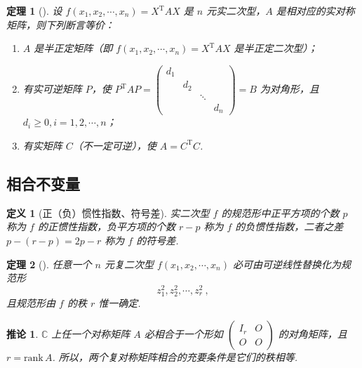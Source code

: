 \documentclass[zihao=-4,UTF8,linespread=1.8,nothm]{aytony_base}
\newtheorem{theorem}{\indent 定理}[subsection]
\newtheorem*{corollary}{\indent 推论}
\newtheorem{definition}{\indent 定义}[subsection]
\begin{document}
\begin{theorem}[]
    设 $f({x}_1, {x}_2, \cdots, {x}_{n}) = X ^{\mathrm{T}}AX$ 是 $n$ 元实二次型，$A$ 是相对应的实对称矩阵，则下列断言等价：
    \begin{enumerate}[nosep]
        \item $A$ 是半正定矩阵（即 $f({x}_1, {x}_2, \cdots, {x}_{n}) = X ^{\mathrm{T}}AX$ 是半正定二次型）；
        \item 有实可逆矩阵 $P$，使 $P ^{\mathrm{T}}AP = \left(
                  \begin{matrix}
                          d_1 &     &        &     \\
                              & d_2 &        &     \\
                              &     & \ddots &     \\
                              &     &        & d_n
                      \end{matrix}
                  \right) = B$ 为对角形，且 $d_i \geqslant 0, i = 1, 2, \cdots, n$；
        \item 有实矩阵 $C$（不一定可逆），使 $A = C ^{\mathrm{T}}C$.
    \end{enumerate}
\end{theorem}

\subsection{相合不变量}

\begin{definition}[正（负）惯性指数、符号差]
    实二次型 $f$ 的规范形中正平方项的个数 $p$ 称为 $f$ 的正惯性指数，负平方项的个数 $r - p$ 称为 $f$ 的负惯性指数，二者之差 $p - (r - p) = 2p - r$ 称为 $f$ 的符号差.
\end{definition}

\begin{theorem}[]
    任意一个 $n$ 元复二次型 $f({x}_1, {x}_2, \cdots, {x}_{n})$ 必可由可逆线性替换化为规范形 $$
        z^2_1, z^2_2, \cdots, z^2_{r}\ ,
    $$ 且规范形由 $f$ 的秩 $r$ 惟一确定.
\end{theorem}

\begin{corollary}
    $\mathbb{C}$ 上任一个对称矩阵 $A$ 必相合于一个形如 $\left(
        \begin{matrix}
                I_r & O \\
                O   & O
            \end{matrix}
        \right)$ 的对角矩阵，且 $r = \mathrm{rank}\,A$. 所以，两个复对称矩阵相合的充要条件是它们的秩相等.
\end{corollary}
\end{document}
